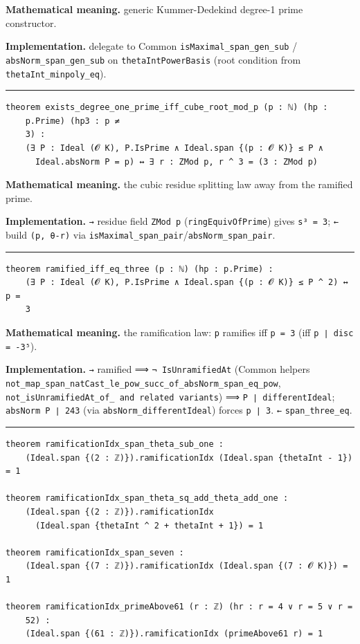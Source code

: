 \documentclass[UTF8,a4paper,11pt,fontset=fandol]{ctexart}
\theoremstyle{definition}
\newcommand{\statementsep}{\par\medskip\hrule\medskip}
\begin{document}
\noindent\textbf{Mathematical meaning.} generic Kummer-Dedekind degree-1 prime constructor.\par
\noindent\textbf{Implementation.} delegate to Common \texttt{isMaximal\_\allowbreak{}span\_\allowbreak{}gen\_\allowbreak{}sub} / \texttt{absNorm\_\allowbreak{}span\_\allowbreak{}gen\_\allowbreak{}sub} on \texttt{thetaIntPowerBasis} (root condition from \texttt{thetaInt\_\allowbreak{}minpoly\_\allowbreak{}eq}).\par
\statementsep
\begin{verbatim}
theorem exists_degree_one_prime_iff_cube_root_mod_p (p : ℕ) (hp :
    p.Prime) (hp3 : p ≠
    3) :
    (∃ P : Ideal (𝓞 K), P.IsPrime ∧ Ideal.span {(p : 𝓞 K)} ≤ P ∧
      Ideal.absNorm P = p) ↔ ∃ r : ZMod p, r ^ 3 = (3 : ZMod p)
\end{verbatim}
\noindent\textbf{Mathematical meaning.} the cubic residue splitting law away from the ramified prime.\par
\noindent\textbf{Implementation.} \texttt{→} residue field \texttt{ZMod p} (\texttt{ringEquivOfPrime}) gives \texttt{s³ = 3}; \texttt{←} build \texttt{(p, θ-r)} via \texttt{isMaximal\_\allowbreak{}span\_\allowbreak{}pair}/\texttt{absNorm\_\allowbreak{}span\_\allowbreak{}pair}.\par
\statementsep
\begin{verbatim}
theorem ramified_iff_eq_three (p : ℕ) (hp : p.Prime) :
    (∃ P : Ideal (𝓞 K), P.IsPrime ∧ Ideal.span {(p : 𝓞 K)} ≤ P ^ 2) ↔ p =
    3
\end{verbatim}
\noindent\textbf{Mathematical meaning.} the ramification law: \texttt{p} ramifies iff \texttt{p = 3} (iff \texttt{p ∣ disc = -3⁵}).\par
\noindent\textbf{Implementation.} \texttt{→} ramified ⟹ \texttt{¬ IsUnramifiedAt} (Common helpers \texttt{not\_\allowbreak{}map\_\allowbreak{}span\_\allowbreak{}natCast\_\allowbreak{}le\_\allowbreak{}pow\_\allowbreak{}succ\_\allowbreak{}of\_\allowbreak{}absNorm\_\allowbreak{}span\_\allowbreak{}eq\_\allowbreak{}pow}, \texttt{not\_\allowbreak{}isUnramifiedAt\_\allowbreak{}of\_\allowbreak{} and related variants}) ⟹ \texttt{P ∣ differentIdeal}; \texttt{absNorm P ∣ 243} (via \texttt{absNorm\_\allowbreak{}differentIdeal}) forces \texttt{p ∣ 3}. \texttt{←} \texttt{span\_\allowbreak{}three\_\allowbreak{}eq}.\par
\statementsep
\begin{verbatim}
theorem ramificationIdx_span_theta_sub_one :
    (Ideal.span {(2 : ℤ)}).ramificationIdx (Ideal.span {thetaInt - 1}) = 1

theorem ramificationIdx_span_theta_sq_add_theta_add_one :
    (Ideal.span {(2 : ℤ)}).ramificationIdx
      (Ideal.span {thetaInt ^ 2 + thetaInt + 1}) = 1

theorem ramificationIdx_span_seven :
    (Ideal.span {(7 : ℤ)}).ramificationIdx (Ideal.span {(7 : 𝓞 K)}) = 1

theorem ramificationIdx_primeAbove61 (r : ℤ) (hr : r = 4 ∨ r = 5 ∨ r =
    52) :
    (Ideal.span {(61 : ℤ)}).ramificationIdx (primeAbove61 r) = 1
\end{verbatim}
\end{document}
